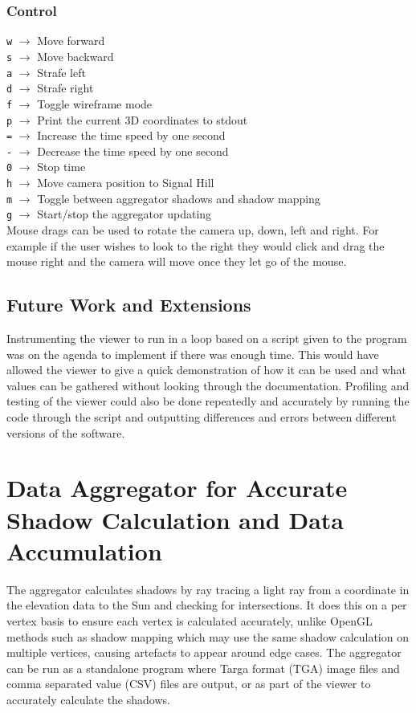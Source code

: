 \documentclass[12pt]{report}
\begin{document}
\subsection{Control}

\texttt{w} $\rightarrow$ Move forward\\
\texttt{s} $\rightarrow$ Move backward\\
\texttt{a} $\rightarrow$ Strafe left\\
\texttt{d} $\rightarrow$ Strafe right\\
\texttt{f} $\rightarrow$ Toggle wireframe mode\\
\texttt{p} $\rightarrow$ Print the current 3D coordinates to stdout\\
\texttt{=} $\rightarrow$ Increase the time speed by one second\\
\texttt{-} $\rightarrow$ Decrease the time speed by one second\\
\texttt{0} $\rightarrow$ Stop time\\
\texttt{h} $\rightarrow$ Move camera position to Signal Hill\\
\texttt{m} $\rightarrow$ Toggle between aggregator shadows and shadow mapping\\
\texttt{g} $\rightarrow$ Start/stop the aggregator updating\\

Mouse drags can be used to rotate the camera up, down, left and right. For example if the user wishes to look to the right they would click and drag the mouse right and the camera will move once they let go of the mouse.

\section{Future Work and Extensions}
Instrumenting the viewer to run in a loop based on a script given to the program was on the agenda to implement if there was enough time. This would have allowed the viewer to give a quick demonstration of how it can be used and what values can be gathered without looking through the documentation. Profiling and testing of the viewer could also be done repeatedly and accurately by running the code through the script and outputting differences and errors between different versions of the software.

\chapter{Data Aggregator for Accurate Shadow Calculation and Data Accumulation}
The aggregator calculates shadows by ray tracing a light ray from a coordinate in the elevation data to the Sun and checking for intersections. It does this on a per vertex basis to ensure each vertex is calculated accurately, unlike OpenGL methods such as shadow mapping which may use the same shadow calculation on multiple vertices, causing artefacts to appear around edge cases. The aggregator can be run as a standalone program where Targa format (TGA) image files and comma separated value (CSV) files are output, or as part of the viewer to accurately calculate the shadows.
\end{document}

